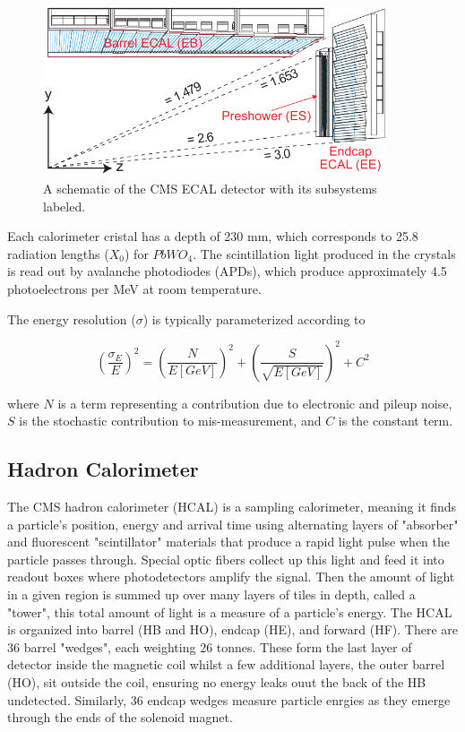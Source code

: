     \begin{figure}[H]
 	\centering
 	\includegraphics[width=0.9\textwidth]{figures/ECAL_transverse_Section.pdf}
 	\singlespace
 	\caption{A schematic of the CMS ECAL detector with its subsystems labeled.}
 	\label{fig:cmsecal}
	 \end{figure}

Each calorimeter cristal has a depth of 230 mm, which corresponds to 25.8 radiation lengths ($X_{0}$) for $PbWO_{4}$. The scintillation light produced in the crystals is read out by avalanche photodiodes (APDs), which produce approximately 4.5 photoelectrons per MeV at room temperature.

The energy resolution ($\sigma$) is typically parameterized according to

\begin{equation}
(\frac{\sigma_{E}}{E})^{2} = (\frac{N}{E[GeV]})^{2} + (\frac{S}{\sqrt{E[GeV]}})^{2} + C^{2}
\end{equation}

where $N$ is a term representing a contribution due to electronic and pileup noise, $S$ is the stochastic contribution to mis-measurement, and $C$ is the constant term. 


 \subsection{Hadron Calorimeter}

 The CMS hadron calorimeter (HCAL) is a sampling calorimeter, meaning it finds a particle's position, energy and arrival time using alternating layers of "absorber" and fluorescent "scintillator" materials that produce a rapid light pulse when the particle passes through. Special optic fibers collect up this light and feed it into readout boxes where photodetectors amplify the signal. Then the amount of light in a given region is summed up over many layers of tiles in depth, called a "tower", this total amount of light is a measure of a particle's energy. The HCAL is organized into barrel (HB and HO), endcap (HE), and forward (HF). There are 36 barrel "wedges", each weighting 26 tonnes. These form the last layer of detector inside the magnetic coil whilst a few additional layers, the outer barrel (HO), sit outside the coil, ensuring no energy leaks ouut the back of the HB undetected. Similarly, 36 endcap wedges measure particle enrgies as they emerge through the ends of the solenoid magnet.

